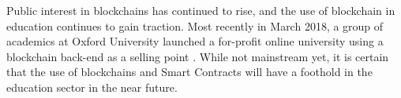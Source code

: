 Public interest in blockchains has continued to rise, and the use of blockchain in education continues 
to gain traction. Most recently in March 2018, a group of academics at Oxford University launched 
a for-profit online university using a blockchain back-end as a selling point \citep{pells2018blockchainuni}. 
While not mainstream yet, it is certain that the use of blockchains and Smart Contracts will 
have a foothold in the education sector in the near future.









